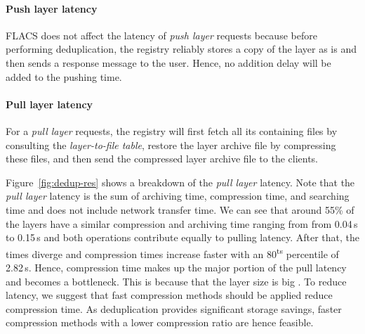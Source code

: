 %
%
%
%

\paragraph{Push layer latency}

FLACS does not affect the latency of \emph{push layer} requests
because before performing deduplication, the registry reliably stores
a copy of the layer as is and then sends a response message to the user.
%
Hence, no addition delay will be added to the pushing time. 
%
\paragraph{Pull layer latency} 

For a \emph{pull layer} requests, the registry will first fetch 
all its containing files by consulting the \emph{layer-to-file table}, 
restore the layer archive file by compressing these files, and
then send the compressed layer archive file to the clients.

Figure~\ref{fig:dedup-res} shows a breakdown of the \emph{pull layer}
latency.
%
Note that the \emph{pull layer} latency is the sum of archiving time,
compression time, and searching time and does not include network transfer
time. 
%
We can see that around 55\% of the layers have a similar compression and archiving
time ranging from from 0.04\,s to 0.15\,s and both operations contribute equally
to pulling latency.
%
%
After that, the times diverge and compression times increase faster with an
80\textsuperscript{ts} percentile of 2.82\,s. Hence, compression time makes
up the major portion of the pull latency and becomes a bottleneck.
This is because that the layer size is big
.
%
%
To reduce latency, we suggest that fast compression methods should be applied reduce
compression time. As deduplication provides significant storage savings, faster compression
methods with a lower compression ratio are hence feasible.

